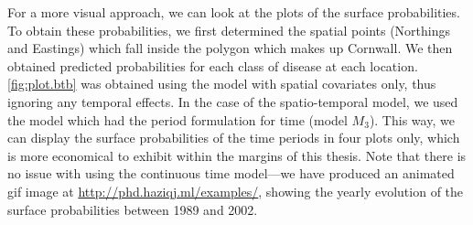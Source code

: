 \documentclass[showframe,11pt]{report}\usepackage[]{graphicx}\usepackage{xcolor}
\begin{document}
For a more visual approach, we can look at the plots of the surface probabilities.
To obtain these probabilities, we first determined the spatial points (Northings and Eastings) which fall inside the polygon which makes up Cornwall.
We then obtained predicted probabilities for each class of disease at each location.
\cref{fig:plot.btb} was obtained using the model with spatial covariates only, thus ignoring any temporal effects.
In the case of the spatio-temporal model, we used the model which had the period formulation for time (model $M_3$).
This way, we can display the surface probabilities of the time periods in four plots only, which is more economical to exhibit within the margins of this thesis.
Note that there is no issue with using the continuous time model---we have produced an animated gif image at \url{http://phd.haziqj.ml/examples/}, showing the yearly evolution of the surface probabilities between 1989 and 2002.
\end{document}
